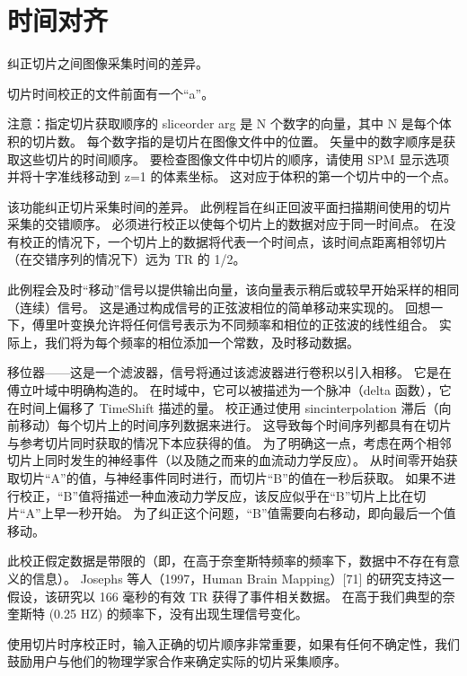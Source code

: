 

\chapter{时间对齐}

纠正切片之间图像采集时间的差异。


切片时间校正的文件前面有一个“a”。


注意：指定切片获取顺序的 sliceorder arg 是 N 个数字的向量，其中 N 是每个体积的切片数。
每个数字指的是切片在图像文件中的位置。
矢量中的数字顺序是获取这些切片的时间顺序。 
要检查图像文件中切片的顺序，请使用 SPM 显示选项并将十字准线移动到 z=1 的体素坐标。
这对应于体积的第一个切片中的一个点。


该功能纠正切片采集时间的差异。
此例程旨在纠正回波平面扫描期间使用的切片采集的交错顺序。
必须进行校正以使每个切片上的数据对应于同一时间点。
在没有校正的情况下，一个切片上的数据将代表一个时间点，该时间点距离相邻切片（在交错序列的情况下）远为 TR 的 1/2。


此例程会及时“移动”信号以提供输出向量，该向量表示稍后或较早开始采样的相同（连续）信号。
这是通过构成信号的正弦波相位的简单移动来实现的。
回想一下，傅里叶变换允许将任何信号表示为不同频率和相位的正弦波的线性组合。
实际上，我们将为每个频率的相位添加一个常数，及时移动数据。




移位器——这是一个滤波器，信号将通过该滤波器进行卷积以引入相移。
它是在傅立叶域中明确构造的。
在时域中，它可以被描述为一个脉冲（delta 函数），它在时间上偏移了 TimeShift 描述的量。
校正通过使用 sincinterpolation 滞后（向前移动）每个切片上的时间序列数据来进行。
这导致每个时间序列都具有在切片与参考切片同时获取的情况下本应获得的值。
为了明确这一点，考虑在两个相邻切片上同时发生的神经事件（以及随之而来的血流动力学反应）。
从时间零开始获取切片“A”的值，与神经事件同时进行，而切片“B”的值在一秒后获取。
如果不进行校正，“B”值将描述一种血液动力学反应，该反应似乎在“B”切片上比在切片“A”上早一秒开始。
为了纠正这个问题，“B”值需要向右移动，即向最后一个值移动。



此校正假定数据是带限的（即，在高于奈奎斯特频率的频率下，数据中不存在有意义的信息）。
Josephs 等人（1997，Human Brain Mapping）[71] 的研究支持这一假设，该研究以 166 毫秒的有效 TR 获得了事件相关数据。
在高于我们典型的奈奎斯特 (0.25 HZ) 的频率下，没有出现生理信号变化。


使用切片时序校正时，输入正确的切片顺序非常重要，如果有任何不确定性，我们鼓励用户与他们的物理学家合作来确定实际的切片采集顺序。


